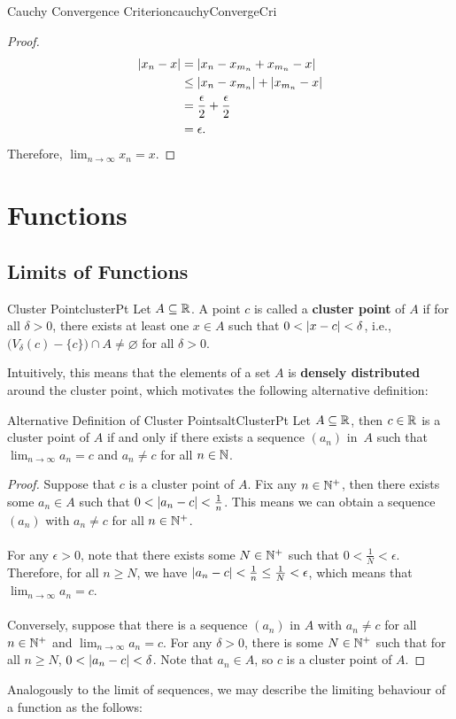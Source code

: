 \documentclass[math]{amznotes}
\theoremstyle{remark}
\begin{document}
\begin{thmbox}{Cauchy Convergence Criterion}{cauchyConvergeCri}
\begin{proof}
        \begin{align*}
            {\left\lvert {x_n - x} \right\rvert} & = {\left\lvert {x_n - x_{m_n} + x_{m_n} - x} \right\rvert} \\
            & \leq {\left\lvert {x_n - x_{m_n}} \right\rvert} + {\left\lvert {x_{m_n} - x} \right\rvert} \\
            & = \frac{\epsilon}{2} + \frac{\epsilon}{2} \\
            & = \epsilon.
        \end{align*}
        Therefore, $\lim_{n \to \infty}x_n = x$.
    \end{proof}
\end{thmbox}

\chapter{Functions}
\section{Limits of Functions}
\begin{dfnbox}{Cluster Point}{clusterPt}
    Let $A \subseteq \mathbb{R}$. A point $c$ is called a {\color{red} \textbf{cluster point}} of $A$ if for all $\delta > 0$, there exists at least one $x \in A$ such that $0 < {\left\lvert {x - c} \right\rvert} < \delta$, i.e., $\bigl(V_\delta(c) - \{c\}\bigr) \cap A \neq \varnothing$ for all $\delta > 0$.
\end{dfnbox}
Intuitively, this means that the elements of a set $A$ is \textbf{densely distributed} around the cluster point, which motivates the following alternative definition:
\begin{thmbox}{Alternative Definition of Cluster Points}{altClusterPt}
    Let $A \subseteq \mathbb{R}$, then $c \in \mathbb{R}$ is a cluster point of $A$ if and only if there exists a sequence $(a_n)$ in~$A$ such that $\lim_{n \to \infty}a_n = c$ and $a_n \neq c$ for all $n \in \mathbb{N}$.
    \tcblower
    \begin{proof}
        Suppose that $c$ is a cluster point of $A$. Fix any $n \in \mathbb{N}^+$, then there exists some $a_n \in A$ such that $0 < {\left\lvert {a_n - c} \right\rvert} < \frac{1}{n}$. This means we can obtain a sequence $(a_n)$ with $a_n \neq c$ for all $n \in \mathbb{N}^+$.
        \\\\
        For any $\epsilon > 0$, note that there exists some $N \in \mathbb{N}^+$ such that $0 < \frac{1}{N} < \epsilon$. Therefore, for all $n \geq N$, we have ${\left\lvert {a_n - c} \right\rvert} < \frac{1}{n} \leq \frac{1}{N} < \epsilon$, which means that $\lim_{n \to \infty}a_n = c$.
        \\\\
        Conversely, suppose that there is a sequence $(a_n)$ in $A$ with $a_n \neq c$ for all $n \in \mathbb{N}^+$ and $\lim_{n \to \infty}a_n = c$. For any $\delta > 0$, there is some $N \in \mathbb{N}^+$ such that for all $n \geq N$, $0 < {\left\lvert {a_n - c} \right\rvert} < \delta$. Note that $a_n \in A$, so $c$ is a cluster point of $A$.
    \end{proof}
\end{thmbox}
Analogously to the limit of sequences, we may describe the limiting behaviour of a function as the follows:
\end{document}
